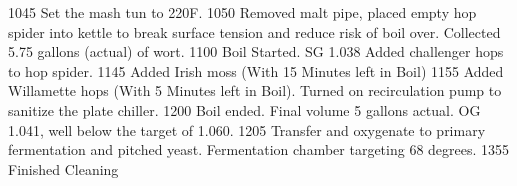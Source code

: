 1045 Set the mash tun to 220F.
1050 Removed malt pipe, placed empty hop spider into kettle to break surface tension and reduce risk of boil over.  Collected 5.75 gallons (actual) of wort.
1100 Boil Started. SG 1.038 Added challenger hops to hop spider.
1145 Added Irish moss (With 15 Minutes left in Boil)
1155 Added Willamette hops (With 5 Minutes left in Boil).  Turned on recirculation pump to sanitize the plate chiller.
1200 Boil ended. Final volume 5 gallons actual. OG 1.041, well below the target of 1.060.
1205 Transfer and oxygenate to primary fermentation and pitched yeast.  Fermentation chamber targeting 68 degrees.
1355 Finished Cleaning

